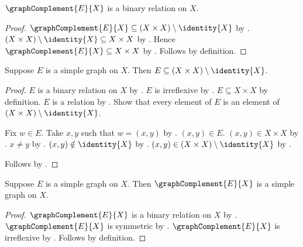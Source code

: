 \begin{proposition}\label{graph_complement_relation}
    $\graphComplement{E}{X}$ is a binary relation on $X$.
\end{proposition}
\begin{proof}
    $\graphComplement{E}{X}\subseteq
        (X\times X)\setminus\identity{X}$ by
        .
    $(X\times X)\setminus\identity{X}\subseteq X\times X$ by
        .
    Hence $\graphComplement{E}{X}\subseteq X\times X$ by
        .
    Follows by definition.
\end{proof}

\begin{proposition}\label{simple_graph_off_diagonal}
    Suppose $E$ is a simple graph on $X$.
    Then $E\subseteq (X\times X)\setminus\identity{X}$.
\end{proposition}
\begin{proof}
    $E$ is a binary relation on $X$ by .
    $E$ is irreflexive by .
    $E\subseteq X\times X$ by definition.
    $E$ is a relation by .
    Show that every element of $E$ is an element of
        $(X\times X)\setminus\identity{X}$.
    \begin{subproof}
        Fix $w\in E$.
        Take $x,y$ such that $w=(x,y)$ by .
        $(x,y)\in E$.
        $(x,y)\in X\times X$ by .
        $x\neq y$ by .
        $(x,y)\notin\identity{X}$ by .
        $(x,y)\in (X\times X)\setminus\identity{X}$ by .
    \end{subproof}
    Follows by .
\end{proof}

\begin{proposition}\label{graph_complement_simple}
    Suppose $E$ is a simple graph on $X$.
    Then $\graphComplement{E}{X}$ is a simple graph on $X$.
\end{proposition}
\begin{proof}
    $\graphComplement{E}{X}$ is a binary relation on $X$ by
        .
    $\graphComplement{E}{X}$ is symmetric by
        .
    $\graphComplement{E}{X}$ is irreflexive by
        .
    Follows by definition.
\end{proof}

